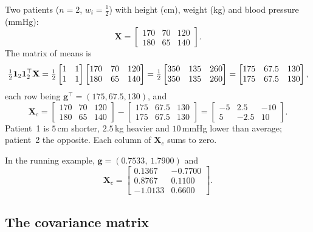 \begin{notechapter}
\begin{example}\label{pca-overview:ex:patients}
Two patients ($n = 2$, $w_i = \frac12$) with height (cm), weight (kg) and blood pressure
(mmHg):
\[
  \mathbf X = \begin{bmatrix}170 & 70 & 120\\ 180 & 65 & 140\end{bmatrix}.
\]
The matrix of means is
\[
  \tfrac12\mathbf{1}_2\mathbf{1}_2^\top\mathbf X
  = \tfrac12\begin{bmatrix}1&1\\1&1\end{bmatrix}\begin{bmatrix}170 & 70 & 120\\ 180 & 65 & 140\end{bmatrix}
  = \tfrac12\begin{bmatrix}350 & 135 & 260\\ 350 & 135 & 260\end{bmatrix}
  = \begin{bmatrix}175 & 67.5 & 130\\ 175 & 67.5 & 130\end{bmatrix},
\]
each row being $\mathbf g^\top = (175, 67.5, 130)$, and
\[
  \mathbf X_c = \begin{bmatrix}170 & 70 & 120\\ 180 & 65 & 140\end{bmatrix} - \begin{bmatrix}175 & 67.5 & 130\\ 175 & 67.5 & 130\end{bmatrix}
  = \begin{bmatrix}-5 & 2.5 & -10\\ 5 & -2.5 & 10\end{bmatrix}.
\]
Patient~1 is $5$\,cm shorter, $2.5$\,kg heavier and $10$\,mmHg lower than average;
patient~2 the opposite. Each column of $\mathbf X_c$ sums to zero.
\end{example}

In the running example, $\mathbf g = (0.7533,\ 1.7900)$ and
\[
  \mathbf X_c = \begin{bmatrix}0.1367 & -0.7700\\ 0.8767 & 0.1100\\ -1.0133 & 0.6600\end{bmatrix}.
\]

\subsection{The covariance matrix}


\end{notechapter}
